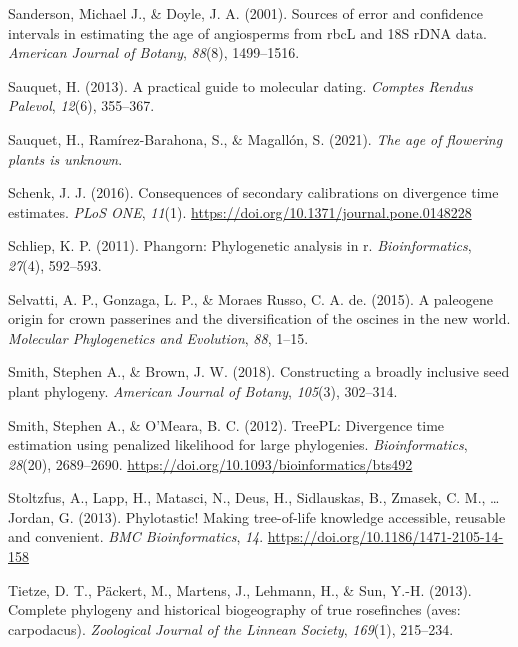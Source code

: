 \documentclass[
  english,
  man]{apa6}
\newlength{\cslhangindent}
\newlength{\cslentryspacingunit} %
\newenvironment{CSLReferences}[2] %
 {%
  \setlength{\parindent}{0pt}
  \ifodd #1
  \let\oldpar\par
  \def\par{\hangindent=\cslhangindent\oldpar}
  \fi
  \setlength{\parskip}{#2\cslentryspacingunit}
 }%
 {}
\begin{document}
\begin{CSLReferences}{1}{0}
\leavevmode{}%
Sanderson, Michael J., \& Doyle, J. A. (2001). Sources of error and confidence intervals in estimating the age of angiosperms from rbcL and 18S rDNA data. \emph{American Journal of Botany}, \emph{88}(8), 1499--1516.

\leavevmode{}%
Sauquet, H. (2013). A practical guide to molecular dating. \emph{{Comptes Rendus Palevol}}, \emph{12}(6), 355--367.

\leavevmode{}%
Sauquet, H., Ramírez-Barahona, S., \& Magallón, S. (2021). \emph{The age of flowering plants is unknown}.

\leavevmode{}%
Schenk, J. J. (2016). {Consequences of secondary calibrations on divergence time estimates}. \emph{PLoS ONE}, \emph{11}(1). \url{https://doi.org/10.1371/journal.pone.0148228}

\leavevmode{}%
Schliep, K. P. (2011). Phangorn: Phylogenetic analysis in r. \emph{Bioinformatics}, \emph{27}(4), 592--593.

\leavevmode{}%
Selvatti, A. P., Gonzaga, L. P., \& Moraes Russo, C. A. de. (2015). A paleogene origin for crown passerines and the diversification of the oscines in the new world. \emph{Molecular Phylogenetics and Evolution}, \emph{88}, 1--15.

\leavevmode{}%
Smith, Stephen A., \& Brown, J. W. (2018). Constructing a broadly inclusive seed plant phylogeny. \emph{American Journal of Botany}, \emph{105}(3), 302--314.

\leavevmode{}%
Smith, Stephen A., \& O'Meara, B. C. (2012). {TreePL: Divergence time estimation using penalized likelihood for large phylogenies}. \emph{Bioinformatics}, \emph{28}(20), 2689--2690. \url{https://doi.org/10.1093/bioinformatics/bts492}

\leavevmode{}%
Stoltzfus, A., Lapp, H., Matasci, N., Deus, H., Sidlauskas, B., Zmasek, C. M., \ldots{} Jordan, G. (2013). {Phylotastic! Making tree-of-life knowledge accessible, reusable and convenient}. \emph{{BMC Bioinformatics}}, \emph{14}. \url{https://doi.org/10.1186/1471-2105-14-158}

\leavevmode{}%
Tietze, D. T., Päckert, M., Martens, J., Lehmann, H., \& Sun, Y.-H. (2013). Complete phylogeny and historical biogeography of true rosefinches (aves: carpodacus). \emph{Zoological Journal of the Linnean Society}, \emph{169}(1), 215--234.


\end{CSLReferences}
\end{document}
